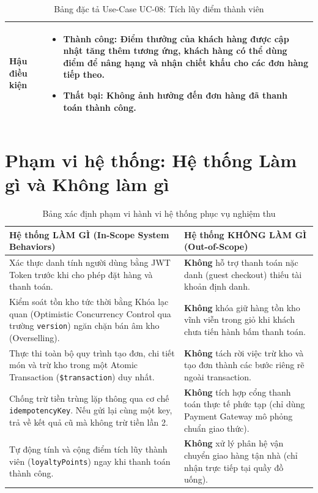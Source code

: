 \documentclass[12pt,a4paper]{article}
\begin{document}
\begin{table}[H]
\begin{tabularx}{\textwidth}{|>{\bfseries\raggedright\arraybackslash}p{3.2cm}|>{\raggedright\arraybackslash}X|}
\hline
Hậu điều kiện & 
\begin{itemize}[leftmargin=*,itemsep=2pt,topsep=2pt,parsep=0pt,partopsep=0pt]
    \item \textbf{Thành công:} Điểm thưởng của khách hàng được cập nhật tăng thêm tương ứng, khách hàng có thể dùng điểm để nâng hạng và nhận chiết khấu cho các đơn hàng tiếp theo.
    \item \textbf{Thất bại:} Không ảnh hưởng đến đơn hàng đã thanh toán thành công.
\end{itemize} \\
\hline
\end{tabularx}
\caption{Bảng đặc tả Use-Case UC-08: Tích lũy điểm thành viên}
\label{tab:uc-08}
\end{table}

\section{Phạm vi hệ thống: Hệ thống Làm gì và Không làm gì}

\begin{table}[H]
\centering
\small
\begin{tabularx}{\textwidth}{>{\raggedright\arraybackslash}p{7.5cm} >{\raggedright\arraybackslash}X}
\toprule
\rowcolor{tableheader}
\textbf{Hệ thống LÀM GÌ (In-Scope System Behaviors)} & \textbf{Hệ thống KHÔNG LÀM GÌ (Out-of-Scope)} \\
\midrule
Xác thực danh tính người dùng bằng JWT Token trước khi cho phép đặt hàng và thanh toán. & \textbf{Không} hỗ trợ thanh toán nặc danh (guest checkout) thiếu tài khoản định danh. \\
\addlinespace
Kiểm soát tồn kho tức thời bằng Khóa lạc quan (Optimistic Concurrency Control qua trường \texttt{version}) ngăn chặn bán âm kho (Overselling). & \textbf{Không} khóa giữ hàng tồn kho vĩnh viễn trong giỏ khi khách chưa tiến hành bấm thanh toán. \\
\addlinespace
Thực thi toàn bộ quy trình tạo đơn, chi tiết món và trừ kho trong một Atomic Transaction (\texttt{\$transaction}) duy nhất. & \textbf{Không} tách rời việc trừ kho và tạo đơn thành các bước riêng rẽ ngoài transaction. \\
\addlinespace
Chống trừ tiền trùng lặp thông qua cơ chế \texttt{idempotencyKey}. Nếu gửi lại cùng một key, trả về kết quả cũ mà không trừ tiền lần 2. & \textbf{Không} tích hợp cổng thanh toán thực tế phức tạp (chỉ dùng Payment Gateway mô phỏng chuẩn giao thức). \\
\addlinespace
Tự động tính và cộng điểm tích lũy thành viên (\texttt{loyaltyPoints}) ngay khi thanh toán thành công. & \textbf{Không} xử lý phân hệ vận chuyển giao hàng tận nhà (chỉ nhận trực tiếp tại quầy đồ uống). \\
\bottomrule
\end{tabularx}
\caption{Bảng xác định phạm vi hành vi hệ thống phục vụ nghiệm thu}
\end{table}
\end{document}
